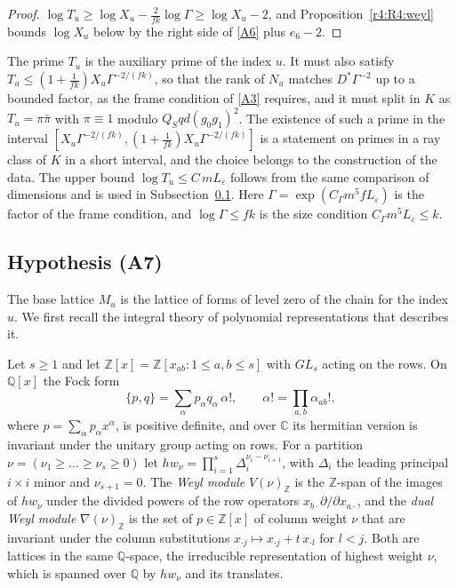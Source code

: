 \begin{proof}
$\log T_u\ge\log X_u-\frac2{fk}\log\Gamma\ge\log X_u-2$, and Proposition~\ref{r4:R4:weyl} bounds $\log X_u$ below by the right side of \eqref{A6} plus $e_6-2$.
\end{proof}

\begin{remark}\label{r4:R4:Tu}
The prime $T_u$ is the auxiliary prime of the index $u$. It must also satisfy $T_u\le(1+\frac1{fk})X_u\Gamma^{-2/(fk)}$, so that the rank of $N_u$ matches $D^*\Gamma^{-2}$ up to a bounded factor, as the frame condition of \eqref{A3} requires, and it must split in $K$ as $T_u=\pi\bar\pi$ with $\pi\equiv1$ modulo $Q_Sqd(g_0g_1)^2$. The existence of such a prime in the interval $[X_u\Gamma^{-2/(fk)},(1+\frac1{fk})X_u\Gamma^{-2/(fk)}]$ is a statement on primes in a ray class of $K$ in a short interval, and the choice belongs to the construction of the data. The upper bound $\log T_u\le C\,mL_\varepsilon$ follows from the same comparison of dimensions and is used in Subsection~\ref{r4:sec:R4A7}. Here $\Gamma=\exp(C_\Gamma m^5fL_\varepsilon)$ is the factor of the frame condition, and $\log\Gamma\le fk$ is the size condition $C_\Gamma m^5L_\varepsilon\le k$.
\end{remark}

\subsection{Hypothesis (A7)}\label{r4:sec:R4A7}

The base lattice $M_u$ is the lattice of forms of level zero of the chain for the index $u$. We first recall the integral theory of polynomial representations that describes it.

Let $s\ge1$ and let $\mathbb Z[x]=\mathbb Z[x_{ab}:1\le a,b\le s]$ with $GL_s$ acting on the rows. On $\mathbb Q[x]$ the Fock form
\[
\{p,q\}=\sum_\alpha p_\alpha q_\alpha\,\alpha!,\qquad\alpha!=\prod_{a,b}\alpha_{ab}!,
\]
where $p=\sum_\alpha p_\alpha x^\alpha$, is positive definite, and over $\mathbb C$ its hermitian version is invariant under the unitary group acting on rows. For a partition $\nu=(\nu_1\ge\dots\ge\nu_s\ge0)$ let $hw_\nu=\prod_{i=1}^s\Delta_i^{\nu_i-\nu_{i+1}}$, with $\Delta_i$ the leading principal $i\times i$ minor and $\nu_{s+1}=0$. The \emph{Weyl module} $V(\nu)_{\mathbb Z}$ is the $\mathbb Z$-span of the images of $hw_\nu$ under the divided powers of the row operators $x_{b\cdot}\partial/\partial x_{a\cdot}$, and the \emph{dual Weyl module} $\nabla(\nu)_{\mathbb Z}$ is the set of $p\in\mathbb Z[x]$ of column weight $\nu$ that are invariant under the column substitutions $x_{\cdot j}\mapsto x_{\cdot j}+t\,x_{\cdot l}$ for $l<j$. Both are lattices in the same $\mathbb Q$-space, the irreducible representation of highest weight $\nu$, which is spanned over $\mathbb Q$ by $hw_\nu$ and its translates.

